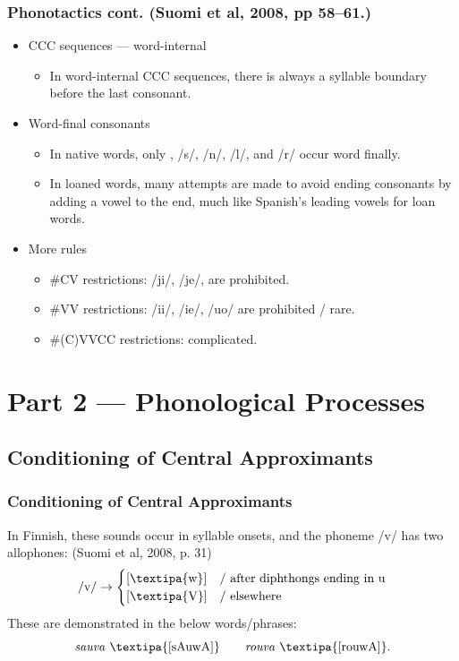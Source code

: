 \documentclass{beamer}
\begin{document}
\begin{frame}
	\frametitle{Phonotactics cont. (Suomi et al, 2008, pp 58--61.)}
	\begin{itemize}
		\item CCC sequences --- word-internal
			\begin{itemize}
				\item In word-internal CCC sequences, there is always a syllable boundary before the last consonant.
			\end{itemize}
		\item Word-final consonants
			\begin{itemize}
				\item In native words, only , /s/, /n/, /l/, and /r/ occur word finally.
				\item In loaned words, many attempts are made to avoid ending consonants by adding a vowel to the end, much like Spanish's leading vowels for loan words.
			\end{itemize}
		\item More rules
			\begin{itemize}
				\item \#CV restrictions: /ji/, /je/,  are prohibited.
				\item \#VV restrictions: /ii/, /ie/, /uo/ are prohibited / rare.
				\item \#(C)VVCC restrictions: complicated.
			\end{itemize}
	\end{itemize}
\end{frame}

\section{Part 2 --- Phonological Processes}

\subsection{Conditioning of Central Approximants}

\begin{frame}
	\frametitle{Conditioning of Central Approximants}
	In Finnish, these sounds occur in syllable onsets, and the phoneme /v/ has two allophones: (Suomi et al, 2008, p. 31)
	\[
		/\text{v}/ \rightarrow
		\begin{cases}
			[\text{\textipa{w}}] & / \text{ after diphthongs ending in u}\\
			[\text{\textipa{V}}] & / \text{ elsewhere}\\
		\end{cases}
	\]
	These are demonstrated in the below words/phrases:
	\[
		\text{\emph{sauva} \textipa{[sAuwA]}} \qquad \text{\emph{rouva} \textipa{[rouwA]}}
	.\]
	
\end{frame}
\end{document}
